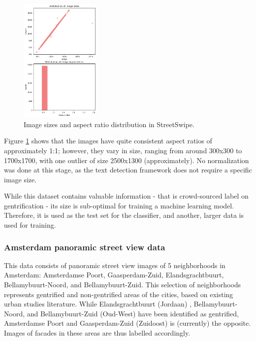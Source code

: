 \begin{figure}[H]
    \centering
    \includegraphics[width=0.35\textwidth]{media/methodology/SS_size_ar.png}
    \caption{Image sizes and aspect ratio distribution in StreetSwipe.}
    \label{fig:SS_size_ar}
\end{figure}

Figure \ref{fig:SS_size_ar} shows that the images have quite consistent aspect ratios of approximately 1:1; however, they vary in size, ranging from around 300x300 to 1700x1700, with one outlier of size 2500x1300 (approximately). No normalization was done at this stage, as the text detection framework does not require a specific image size.

While this dataset contains valuable information - that is crowd-sourced label on gentrification - its size is sub-optimal for training a machine learning model. Therefore, it is used as the test set for the classifier, and another, larger data is used for training.

\subsubsection{Amsterdam panoramic street view data}
This data consists of panoramic street view images of 5 neighborhoods in Amsterdam: Amsterdamse Poort, Gaasperdam-Zuid, Elandsgrachtbuurt, Bellamybuurt-Noord, and Bellamybuurt-Zuid. This selection of neighborhoods represents gentrified and non-gentrified areas of the cities, based on existing urban studies literature. While Elandsgrachtbuurt (Jordaan) \cite{verlaan_hippies_2022}, Bellamybuurt-Noord, and Bellamybuurt-Zuid (Oud-West) \cite{rettberg_when_2019} have been identified as gentrified, Amsterdamse Poort and Gaasperdam-Zuid (Zuidoost) \cite{pinkster_stickiness_2020} is (currently) the opposite. Images of facades in these areas are thus labelled accordingly.

